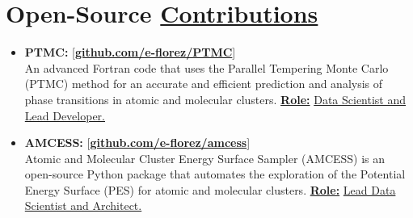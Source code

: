 \section{Open-Source \href{.}{Contributions}}

\begin{itemize}[leftmargin=5mm]
    \item \textbf{PTMC:}\hfill
          [\href{https://github.com/e-florez/PTMC}{\bf github.com/e-florez/PTMC}]\\
          An advanced Fortran code that uses the Parallel Tempering Monte Carlo (PTMC) method for an accurate and efficient prediction and analysis of phase transitions in atomic and molecular clusters.
          \textbf{\href{.}{Role:}} \underline{Data Scientist and Lead Developer.}

    \item \textbf{AMCESS:}\hfill
          [\href{https://github.com/e-florez/amcess}{\bf github.com/e-florez/amcess}]\\
          Atomic and Molecular Cluster Energy Surface Sampler (AMCESS) is an open-source Python package that automates the exploration of the Potential Energy Surface (PES) for atomic and molecular clusters. %
          \textbf{\href{.}{Role:}} \underline{Lead Data Scientist and Architect.}




\end{itemize}